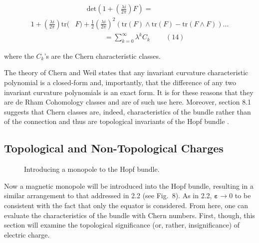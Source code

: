 \documentclass[fleqn, twocolumn, 10pt]{article}
\begin{document}
\begin{ceqn}
\begin{align*}
&\;\;\;\;\;\;\text{det}\left(1+\left(\frac{\lambda i}{2\pi}\right)F\right) 
=\\ 1 + \left(\frac{\lambda i}{2\pi}\right)\text{tr}(&F) + \frac{1}{2}\left(\frac{\lambda i}{2\pi}\right)^2\left(\text{tr}(F)\land\text{tr}(F)- \text{tr}(F\land F)\right)\ldots\\ 
&\;\;\;\;\;\;\;\;\;\;\;\;\;\;\;= \sum_{k=0}^{\infty}\lambda^kC_k\;\;\;\;\;\;\;\; (14)
\end{align*}
\end{ceqn}
where the $C_k$'s are the Chern characteristic classes. 

The theory of Chern and Weil states that any invariant curvature characteristic polynomial is a closed-form and, importantly, that the difference of any two invariant curvature polynomials is an exact form. It is for these reasons that they are de Rham Cohomology classes and are of such use here. Moreover, section 8.1 suggests that Chern classes are, indeed, characteristics of the bundle rather than of the connection and thus are topological invariants of the Hopf bundle \cite{shnir, nakahara2003geometry, kai2015lam}.

\subsection{Topological and Non-Topological Charges}
\begin{figure}[t]
\centering
{}
\caption{Introducing a monopole to the Hopf bundle.}
\end{figure}

Now a magnetic monopole will be introduced into the Hopf bundle, resulting in a similar arrangement to that addressed in 2.2 (see Fig.~8). As in 2.2, $\bm{\varepsilon} \to 0$ to be consistent with the fact that only the equator is considered. From here, one can evaluate the characteristics of the bundle with Chern numbers. First, though, this section will examine the topological significance (or, rather, insignificance) of electric charge.
\end{document}
